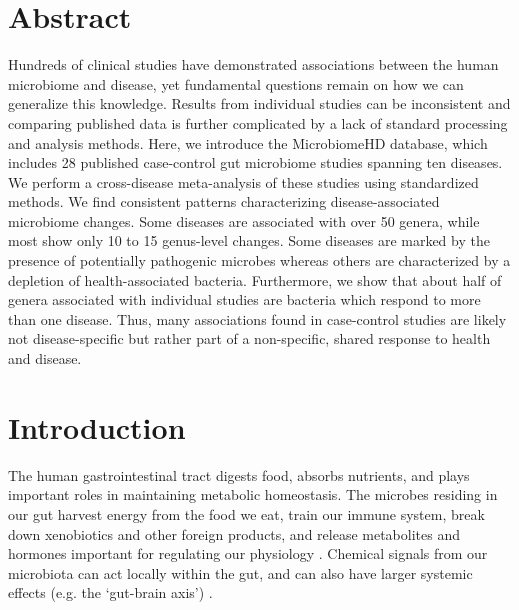


\section*{Abstract}
Hundreds of clinical studies have demonstrated associations between the human microbiome and disease, yet fundamental questions remain on how we can generalize this knowledge.
Results from individual studies can be inconsistent and comparing published data is further complicated by a lack of standard processing and analysis methods.
Here, we introduce the MicrobiomeHD database, which includes 28 published case-control gut microbiome studies spanning ten diseases.
We perform a cross-disease meta-analysis of these studies using standardized methods.
We find consistent patterns characterizing disease-associated microbiome changes.
Some diseases are associated with over 50 genera, while most show only 10 to 15 genus-level changes.
Some diseases are marked by the presence of potentially pathogenic microbes whereas others are characterized by a depletion of health-associated bacteria.
Furthermore, we show that about half of genera associated with individual studies are bacteria which respond to more than one disease.
Thus, many associations found in case-control studies are likely not disease-specific but rather part of a non-specific, shared response to health and disease.

\newpage

\section*{Introduction}

The human gastrointestinal tract digests food, absorbs nutrients, and plays important roles in maintaining metabolic homeostasis.
The microbes residing in our gut harvest energy from the food we eat, train our immune system, break down xenobiotics and other foreign products, and release metabolites and hormones important for regulating our physiology \cite{nash-baker, asd-kb, turnbaugh2006obesity}.
Chemical signals from our microbiota can act locally within the gut, and can also have larger systemic effects (e.g. the `gut-brain axis') \cite{Hsiao2013gutbrain,Cryan2012gutbrain,Poutahidis2013gutbrain}.

